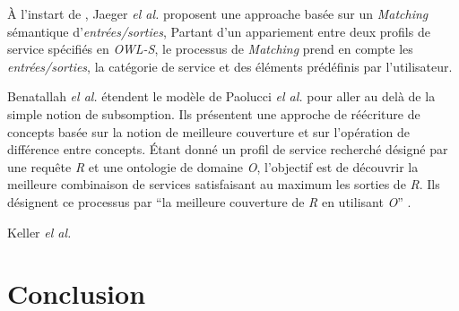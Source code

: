    À l'instart de \cite{paolucci2002semantic}, Jaeger \emph{el al.}
    \cite{jaeger2005ranked} proposent une approache basée sur un
    \textit{Matching} sémantique d'\textit{entrées/sorties}, Partant
    d'un appariement entre deux profils de service spécifiés en
    \textit{OWL-S}, le processus de \textit{Matching} prend en compte
    les \textit{entrées/sorties}, la catégorie de service et des
    éléments prédéfinis par l'utilisateur.\bigskip

    Benatallah \emph{el al.} \cite{benatallah2005automating,
      benatallah2003request} étendent le modèle de Paolucci \emph{el
      al.}  pour aller au delà de la simple notion de subsomption. Ils
    présentent une approche de réécriture de concepts basée sur la
    notion de meilleure couverture et sur l'opération de différence
    entre concepts. Étant donné un profil de service recherché désigné
    par une requête \textit{R} et une ontologie de domaine \textit{O},
    l'objectif est de découvrir la meilleure combinaison de services
    satisfaisant au maximum les sorties de \textit{R}. Ils désignent
    ce processus par ``la meilleure couverture de \textit{R} en
    utilisant \textit{O}'' \cite{elie2010}.\bigskip

    Keller \emph{el al.} \cite{keller2004wsmo}

\section{Conclusion}

